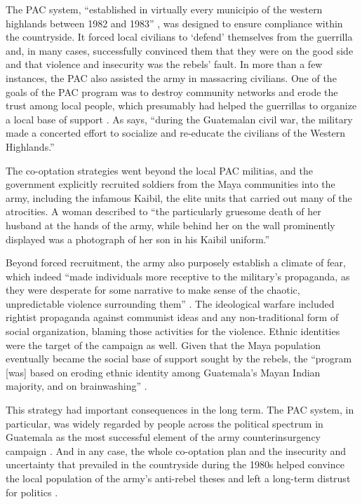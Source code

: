 \documentclass[12pt, notitlepage]{article}
\begin{document}
The PAC system, ``established in virtually every municipio of the western highlands between 1982 and 1983'' \citep[272]{Smith:1990ab}, was designed to ensure compliance within the countryside.
It forced local civilians to `defend' themselves from the guerrilla and, in many cases, successfully convinced them that they were on the good side and that violence and insecurity was the rebels' fault.
In more than a few instances, the PAC also assisted the army in massacring civilians.%
One of the goals of the PAC program was to destroy community networks and erode the trust among local people, which presumably had helped the guerrillas to organize a local base of support \citep{SaenzdeTejada:2004aa}.
As \citet[641]{Bateson:2017aa} says, ``during the Guatemalan civil war, the military made a concerted effort to socialize and re-educate the civilians of the Western Highlands.''

The co-optation strategies went beyond the local PAC militias, and the government explicitly recruited soldiers from the Maya communities into the army, including the infamous Kaibil, the elite units that carried out many of the atrocities.
A woman described to \citet[112]{Green:1995aa} ``the particularly gruesome death of her husband at the hands of the army, while behind her on the wall prominently displayed was a photograph of her son in his Kaibil uniform.''

Beyond forced recruitment, the army also purposely establish a climate of fear, which indeed ``made individuals more receptive to the military's propaganda, as they were desperate for some narrative to make sense of the chaotic, unpredictable violence surrounding them'' \citep[643]{Bateson:2017aa}.
The ideological warfare included rightist propaganda against communist ideas and any non-traditional form of social organization, blaming those activities for the violence.
Ethnic identities were the target of the campaign as well.
Given that the Maya population eventually became the social base of support sought by the rebels, the ``program [was] based on eroding ethnic identity among Guatemala's Mayan Indian majority, and on brainwashing'' \citep[21]{Black:1985aa}.

This strategy had important consequences in the long term.
The PAC system, in particular, was widely regarded by people across the political spectrum in Guatemala as the most successful element of the army counterinsurgency campaign \citep[101]{Garrard-Burnett:2010aa}.
And in any case, the whole co-optation plan and the insecurity and uncertainty that prevailed in the countryside during the 1980s helped convince the local population of the army's anti-rebel theses and left a long-term distrust for politics \citep{Green:1995aa}.
\end{document}
